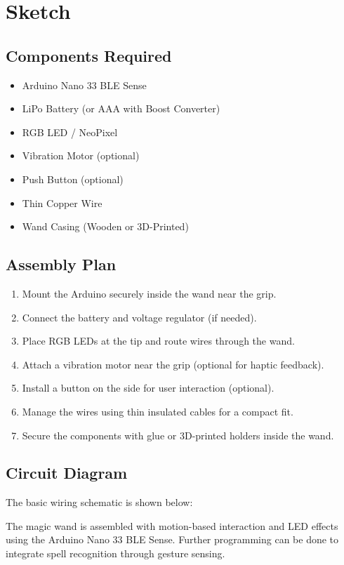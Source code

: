 %
%


\chapter{Sketch}

\section{Components Required}
\begin{itemize}
	\item Arduino Nano 33 BLE Sense
	\item LiPo Battery (or AAA with Boost Converter)
	\item RGB LED / NeoPixel
	\item Vibration Motor (optional)
	\item Push Button (optional)
	\item Thin Copper Wire
	\item Wand Casing (Wooden or 3D-Printed)
\end{itemize}

\section{Assembly Plan}
\begin{enumerate}
	\item Mount the Arduino securely inside the wand near the grip.
	\item Connect the battery and voltage regulator (if needed).
	\item Place RGB LEDs at the tip and route wires through the wand.
	\item Attach a vibration motor near the grip (optional for haptic feedback).
	\item Install a button on the side for user interaction (optional).
	\item Manage the wires using thin insulated cables for a compact fit.
	\item Secure the components with glue or 3D-printed holders inside the wand.
\end{enumerate}

\section{Circuit Diagram}
The basic wiring schematic is shown below:

The magic wand is assembled with motion-based interaction and LED effects using the Arduino Nano 33 BLE Sense. Further programming can be done to integrate spell recognition through gesture sensing.
